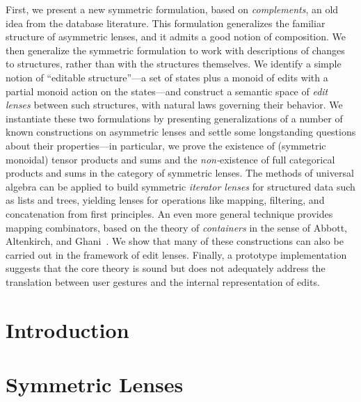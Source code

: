\documentclass[12pt]{report}
\numberwithin{equation}{section}
\begin{document}
First, we present a new symmetric formulation, based on {\em complements},
an old idea from the database literature. This formulation generalizes the
familiar structure of asymmetric lenses, and it admits a good notion of
composition. We then generalize the symmetric formulation to work with
descriptions of changes to structures, rather than with the structures
themselves. We identify a simple notion of ``editable structure''---a set of
states plus a monoid of edits with a partial monoid action on the
states---and construct a semantic space of {\em edit lenses} between such
structures, with natural laws governing their behavior. We instantiate these
two formulations by presenting generalizations of a number of known
constructions on asymmetric lenses and settle some longstanding questions
about their properties---in particular, we prove the existence of (symmetric
monoidal) tensor products and sums and the {\em non-}existence of full
categorical products and sums in the category of symmetric lenses. The
methods of universal algebra can be applied to build symmetric {\em iterator
lenses} for structured data such as lists and trees, yielding lenses for
operations like mapping, filtering, and concatenation from first principles.
An even more general technique provides mapping combinators, based on the
theory of {\em containers} in the sense of Abbott, Altenkirch, and
Ghani~\cite{1195941}. We show that many of these constructions can also be
carried out in the framework of edit lenses. Finally, a prototype
implementation suggests that the core theory is sound but does not
adequately address the translation between user gestures and the internal
representation of edits.

\vspace*{\fill}

\newpage

\tableofcontents

\newpage

\listoftables

\listoffigures

\newpage
\singlespacing
{}

\chapter{Introduction}
\label{chap:introduction}
\label{chap:intro}



\chapter{Symmetric Lenses}
\label{chap:complement}
\label{chap:symmetric}
\label{chap:symmetry}
\label{chap:symm}
\end{document}
